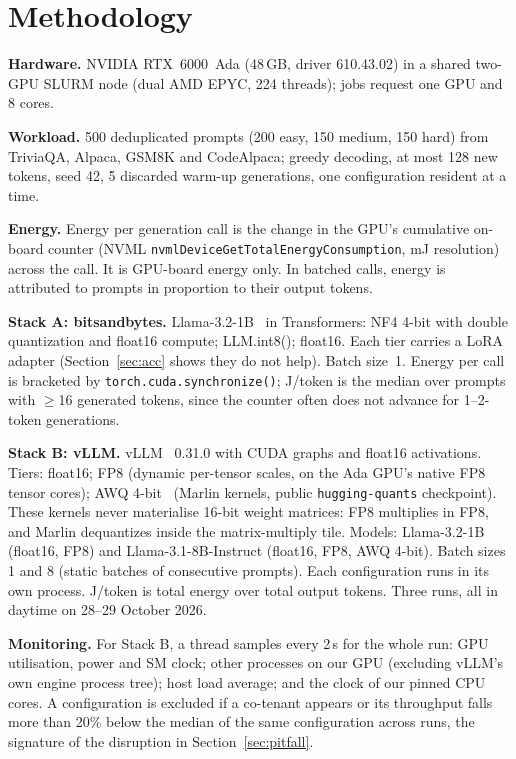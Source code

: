 \documentclass[conference]{IEEEtran}
\begin{document}
\section{Methodology}
\label{sec:method}
\textbf{Hardware.} NVIDIA RTX~6000~Ada (48\,GB, driver 610.43.02) in a shared two-GPU SLURM node (dual AMD EPYC, 224 threads); jobs request one GPU and 8 cores.

\textbf{Workload.} 500 deduplicated prompts (200 easy, 150 medium, 150 hard) from TriviaQA, Alpaca, GSM8K and CodeAlpaca; greedy decoding, at most 128 new tokens, seed 42, 5 discarded warm-up generations, one configuration resident at a time.

\textbf{Energy.} Energy per generation call is the change in the GPU's cumulative on-board counter (NVML \texttt{nvmlDeviceGetTotalEnergyConsumption}, mJ resolution) across the call. It is GPU-board energy only. In batched calls, energy is attributed to prompts in proportion to their output tokens.

\textbf{Stack A: bitsandbytes.} Llama-3.2-1B~\cite{llama3} in Transformers: NF4 4-bit with double quantization and float16 compute; LLM.int8(); float16. Each tier carries a LoRA adapter (Section~\ref{sec:acc} shows they do not help). Batch size~1. Energy per call is bracketed by \texttt{torch.cuda.synchronize()}; J/token is the median over prompts with $\geq$16 generated tokens, since the counter often does not advance for 1--2-token generations.

\textbf{Stack B: vLLM.} vLLM~\cite{kwon2023vllm} 0.31.0 with CUDA graphs and float16 activations. Tiers: float16; FP8 (dynamic per-tensor scales, on the Ada GPU's native FP8 tensor cores); AWQ 4-bit~\cite{lin2024awq} (Marlin kernels, public \texttt{hugging-quants} checkpoint). These kernels never materialise 16-bit weight matrices: FP8 multiplies in FP8, and Marlin dequantizes inside the matrix-multiply tile. Models: Llama-3.2-1B (float16, FP8) and Llama-3.1-8B-Instruct (float16, FP8, AWQ 4-bit). Batch sizes 1 and 8 (static batches of consecutive prompts). Each configuration runs in its own process. J/token is total energy over total output tokens. Three runs, all in daytime on 28--29 October 2026.

\textbf{Monitoring.} For Stack B, a thread samples every 2\,s for the whole run: GPU utilisation, power and SM clock; other processes on our GPU (excluding vLLM's own engine process tree); host load average; and the clock of our pinned CPU cores. A configuration is excluded if a co-tenant appears or its throughput falls more than 20\% below the median of the same configuration across runs, the signature of the disruption in Section~\ref{sec:pitfall}.
\end{document}
